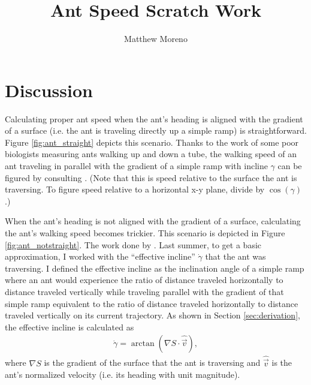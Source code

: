 \documentclass{article}
\title{Ant Speed Scratch Work}
\author{Matthew Moreno}
\begin{document}
\maketitle

\section{Discussion}

Calculating proper ant speed when the ant's heading is aligned with the gradient of a surface (i.e. the ant is traveling directly up a simple ramp) is straightforward.
Figure \ref{fig:ant_straight} depicts this scenario.
Thanks to the work of some poor biologists measuring ants walking up and down a tube, the walking speed of an ant traveling in parallel with the gradient of a simple ramp with incline $\gamma$ can be figured by consulting \cite[Figure 2B]{Holt2012LocomotionTerrain}.
(Note that this is speed relative to the surface the ant is traversing.
To figure speed relative to a horizontal x-y plane, divide by $\cos(\gamma)$.)

When the ant's heading is not aligned with the gradient of a surface, calculating the ant's walking speed becomes trickier. 
This scenario is depicted in Figure \ref{fig:ant_notstraight}.
The work done by \cite{Holt2012LocomotionTerrain}.
Last summer, to get a basic approximation, I worked with the ``effective incline'' $\dot{\gamma}$ that the ant was traversing.
I defined the effective incline as the inclination angle of a simple ramp where an ant would experience the ratio of distance traveled horizontally to distance traveled vertically while traveling parallel with the gradient of that simple ramp equivalent to the ratio of distance traveled horizontally to distance traveled vertically on its current trajectory.
As shown in Section \ref{sec:derivation}, the effective incline is calculated as
\begin{align} \label{eqn:effectiveincline}
\dot{\gamma} = \arctan{(\nabla S \cdot \hat{\vec{v}})},
\end{align}
where $\nabla S$ is the gradient of the surface that the ant is traversing and $\hat{\vec{v}}$ is the ant's normalized velocity (i.e. its heading with unit magnitude).
\end{document}
